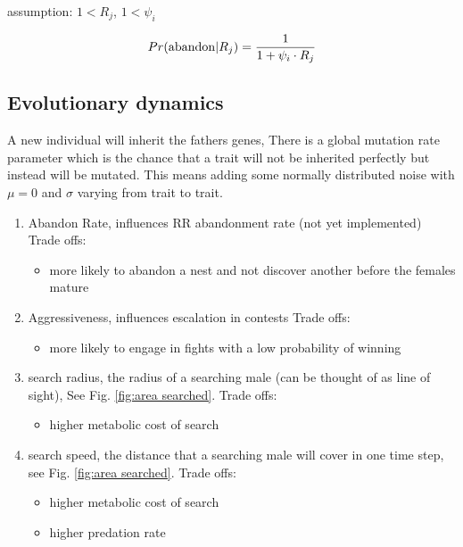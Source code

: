 \documentclass[a4paper,11pt]{article}
\begin{document}
assumption: $1 < R_j$,  $1 < \psi_i$

\begin{equation} \label{eq:abandon}
    Pr({\rm abandon} | R_j ) = \frac{1}{1 + \psi_i \cdot R_j}
\end{equation}


\subsection{Evolutionary dynamics}

A new individual will inherit the fathers genes,
There is a global mutation rate parameter which is the chance that a trait will not be inherited perfectly but instead will be mutated.
This means adding some normally distributed noise with $\mu = 0$ and $\sigma$ varying from trait to trait.

\begin{enumerate}
    \item Abandon Rate, influences RR abandonment rate (not yet implemented)
    Trade offs:
    \begin{itemize}
        \item more likely to abandon a nest and not discover another before the females mature
    \end{itemize}

    \item Aggressiveness, influences escalation in contests
    Trade offs:
    \begin{itemize}
        \item more likely to engage in fights with a low probability of winning
    \end{itemize}
    
    \item search radius, the radius of a searching male (can be thought of as line of sight), See Fig. \ref{fig:area searched}.
    Trade offs:
    \begin{itemize}
        \item higher metabolic cost of search
    \end{itemize}

    \item search speed, the distance that a searching male will cover in one time step, see Fig. \ref{fig:area searched}.
    Trade offs:
        \begin{itemize}
            \item higher metabolic cost of search
            \item higher predation rate
        \end{itemize}
\end{enumerate}
\end{document}
